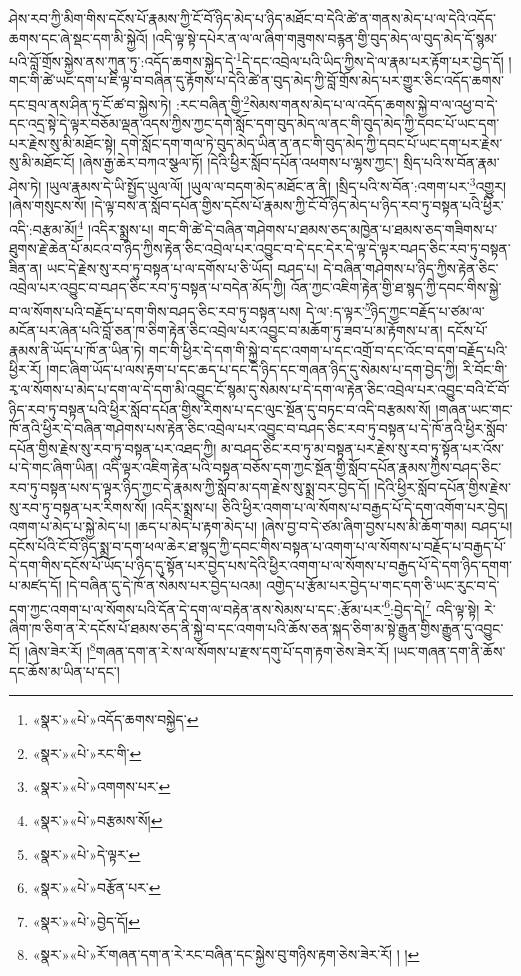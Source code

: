 ཤེས་རབ་ཀྱི་མིག་གིས་དངོས་པོ་རྣམས་ཀྱི་ངོ་བོ་ཉིད་མེད་པ་ཉིད་མཐོང་བ་དེའི་ཚེ་ན་གནས་མེད་པ་ལ་དེའི་འདོད་ཆགས་དང་ཞེ་སྡང་དག་མི་སྐྱེའོ། །འདི་ལྟ་སྟེ་དཔེར་ན་ལ་ལ་ཞིག་གཟུགས་བརྙན་གྱི་བུད་མེད་ལ་བུད་མེད་དོ་སྙམ་པའི་བློ་གྲོས་སྐྱེས་ནས་ཀུན་ཏུ་:འདོད་ཆགས་སྐྱེད་དེ་\footnote{«སྣར་»«པེ་»འདོད་ཆགས་བསྐྱེད་}དེ་དང་འབྲེལ་པའི་ཡིད་ཀྱིས་དེ་ལ་རྣམ་པར་རྟོག་པར་བྱེད་དོ། །གང་གི་ཚེ་ཡང་དག་པ་ཇི་ལྟ་བ་བཞིན་དུ་རྟོགས་པ་དེའི་ཚེ་ན་བུད་མེད་ཀྱི་བློ་གྲོས་མེད་པར་གྱུར་ཅིང་འདོད་ཆགས་དང་བྲལ་ནས་ཤིན་ཏུ་ངོ་ཚ་བ་སྐྱེས་ཏེ། :རང་བཞིན་གྱི་\footnote{«སྣར་»«པེ་»རང་གི་}སེམས་གནས་མེད་པ་ལ་འདོད་ཆགས་སྐྱེ་བ་ལ་འཕྱ་བ་དེ་དང་འདྲ་སྟེ་དེ་ལྟར་བཅོམ་ལྡན་འདས་ཀྱིས་ཀྱང་དགེ་སློང་དག་བུད་མེད་ལ་ནང་གི་བུད་མེད་ཀྱི་དབང་པོ་ཡང་དག་པར་རྗེས་སུ་མི་མཐོང་སྟེ། དགེ་སློང་དག་གལ་ཏེ་བུད་མེད་ཡིན་ན་ནང་གི་བུད་མེད་ཀྱི་དབང་པོ་ཡང་དག་པར་རྗེས་སུ་མི་མཐོང་ངོ། །ཞེས་རྒྱ་ཆེར་བཀའ་སྩལ་ཏོ། །དེའི་ཕྱིར་སློབ་དཔོན་འཕགས་པ་ལྷས་ཀྱང་། སྲིད་པའི་ས་བོན་རྣམ་ཤེས་ཏེ། །ཡུལ་རྣམས་དེ་ཡི་སྤྱོད་ཡུལ་ལོ། །ཡུལ་ལ་བདག་མེད་མཐོང་ན་ནི། །སྲིད་པའི་ས་བོན་:འགག་པར་\footnote{«སྣར་»«པེ་»འགགས་པར་}འགྱུར། །ཞེས་གསུངས་སོ། །དེ་ལྟ་བས་ན་སློབ་དཔོན་གྱིས་དངོས་པོ་རྣམས་ཀྱི་ངོ་བོ་ཉིད་མེད་པ་ཉིད་རབ་ཏུ་བསྟན་པའི་ཕྱིར་འདི་:བརྩམ་མོ།\footnote{«སྣར་»«པེ་»བརྩམས་སོ།} །འདིར་སྨྲས་པ། གང་གི་ཚེ་དེ་བཞིན་གཤེགས་པ་ཐམས་ཅད་མཁྱེན་པ་ཐམས་ཅད་གཟིགས་པ་ཐུགས་རྗེ་ཆེན་པོ་མངའ་བ་ཉིད་ཀྱིས་རྟེན་ཅིང་འབྲེལ་པར་འབྱུང་བ་དེ་དང་དེར་དེ་ལྟ་དེ་ལྟར་བཤད་ཅིང་རབ་ཏུ་བསྟན་ཟིན་ན། ཡང་དེ་རྗེས་སུ་རབ་ཏུ་བསྟན་པ་ལ་དགོས་པ་ཅི་ཡོད། བཤད་པ། དེ་བཞིན་གཤེགས་པ་ཉིད་ཀྱིས་རྟེན་ཅིང་འབྲེལ་པར་འབྱུང་བ་བཤད་ཅིང་རབ་ཏུ་བསྟན་པ་བདེན་མོད་ཀྱི། འོན་ཀྱང་འཇིག་རྟེན་གྱི་ཐ་སྙད་ཀྱི་དབང་གིས་སྐྱེ་བ་ལ་སོགས་པའི་བརྗོད་པ་དག་གིས་བཤད་ཅིང་རབ་ཏུ་བསྟན་པས། དེ་ལ་:ད་ལྟར་\footnote{«སྣར་»«པེ་»དེ་ལྟར་}ཉིད་ཀྱང་བརྗོད་པ་ཙམ་ལ་མངོན་པར་ཞེན་པའི་བློ་ཅན་ཁ་ཅིག་རྟེན་ཅིང་འབྲེལ་པར་འབྱུང་བ་མཆོག་ཏུ་ཟབ་པ་མ་རྟོགས་པ་ན། དངོས་པོ་རྣམས་ནི་ཡོད་པ་ཁོ་ན་ཡིན་ཏེ། གང་གི་ཕྱིར་དེ་དག་གི་སྐྱེ་བ་དང་འགག་པ་དང་འགྲོ་བ་དང་འོང་བ་དག་བརྗོད་པའི་ཕྱིར་རོ། །གང་ཞིག་ཡོད་པ་ལས་རྟག་པ་དང་ཆད་པ་དང་དེ་ཉིད་དང་གཞན་ཉིད་དུ་སེམས་པ་དག་བྱེད་ཀྱི། རི་བོང་གི་རྭ་ལ་སོགས་པ་མེད་པ་དག་ལ་དེ་དག་མི་འབྱུང་ངོ་སྙམ་དུ་སེམས་པ་དེ་དག་ལ་རྟེན་ཅིང་འབྲེལ་པར་འབྱུང་བའི་ངོ་བོ་ཉིད་རབ་ཏུ་བསྟན་པའི་ཕྱིར་སློབ་དཔོན་གྱིས་རིགས་པ་དང་ལུང་སྔོན་དུ་བཏང་བ་འདི་བརྩམས་སོ། །གཞན་ཡང་གང་ཁོ་ནའི་ཕྱིར་དེ་བཞིན་གཤེགས་པས་རྟེན་ཅིང་འབྲེལ་པར་འབྱུང་བ་བཤད་ཅིང་རབ་ཏུ་བསྟན་པ་དེ་ཁོ་ནའི་ཕྱིར་སློབ་དཔོན་གྱིས་རྗེས་སུ་རབ་ཏུ་བསྟན་པར་འཐད་ཀྱི། མ་བཤད་ཅིང་རབ་ཏུ་མ་བསྟན་པར་རྗེས་སུ་རབ་ཏུ་སྟོན་པར་འོས་པ་དེ་གང་ཞིག་ཡིན། འདི་ལྟར་འཇིག་རྟེན་པའི་བསྟན་བཅོས་དག་ཀྱང་སྔོན་གྱི་སློབ་དཔོན་རྣམས་ཀྱིས་བཤད་ཅིང་རབ་ཏུ་བསྟན་པས་ད་ལྟར་ཉིད་ཀྱང་དེ་རྣམས་ཀྱི་སློབ་མ་དག་རྗེས་སུ་སྨྲ་བར་བྱེད་དོ། །དེའི་ཕྱིར་སློབ་དཔོན་གྱིས་རྗེས་སུ་རབ་ཏུ་བསྟན་པར་རིགས་སོ། །འདིར་སྨྲས་པ། ཅིའི་ཕྱིར་འགག་པ་ལ་སོགས་པ་བརྒྱད་པོ་དེ་དག་འགོག་པར་བྱེད། འགག་པ་མེད་པ་སྐྱེ་མེད་པ། །ཆད་པ་མེད་པ་རྟག་མེད་པ། །ཞེས་བྱ་བ་དེ་ཙམ་ཞིག་བྱས་པས་མི་ཆོག་གམ། བཤད་པ། དངོས་པོའི་ངོ་བོ་ཉིད་སྨྲ་བ་དག་ཕལ་ཆེར་ཐ་སྙད་ཀྱི་དབང་གིས་བསྟན་པ་འགག་པ་ལ་སོགས་པ་བརྗོད་པ་བརྒྱད་པོ་དེ་དག་གིས་དངོས་པོ་ཡོད་པ་ཉིད་དུ་སྟོན་པར་བྱེད་པས་དེའི་ཕྱིར་འགག་པ་ལ་སོགས་པ་བརྒྱད་པོ་དེ་དག་ཉིད་དགག་པ་མཛད་དོ། །དེ་བཞིན་དུ་དེ་ཁོ་ན་སེམས་པར་བྱེད་པའམ། འགྱེད་པ་རྩོམ་པར་བྱེད་པ་གང་དག་ཅི་ཡང་རུང་བ་དེ་དག་ཀྱང་འགག་པ་ལ་སོགས་པའི་དོན་དེ་དག་ལ་བརྟེན་ནས་སེམས་པ་དང་:རྩོམ་པར་\footnote{«སྣར་»«པེ་»བརྩོན་པར་}:བྱེད་དེ།\footnote{«སྣར་»«པེ་»བྱེད་དོ།} འདི་ལྟ་སྟེ། རེ་ཞིག་ཁ་ཅིག་ན་རེ་དངོས་པོ་ཐམས་ཅད་ནི་སྐྱེ་བ་དང་འགག་པའི་ཆོས་ཅན་སྐད་ཅིག་མ་སྟེ་རྒྱུན་གྱིས་རྒྱུན་དུ་འབྱུང་ངོ། །ཞེས་ཟེར་རོ། །\footnote{«སྣར་»«པེ་»རོ་གཞན་དག་ན་རེ་རང་བཞིན་དང་སྐྱེས་བུ་གཉིས་རྟག་ཅེས་ཟེར་རོ། ། །}གཞན་དག་ན་རེ་ས་ལ་སོགས་པ་རྫས་དགུ་པོ་དག་རྟག་ཅེས་ཟེར་རོ། །ཡང་གཞན་དག་ནི་ཆོས་དང་ཆོས་མ་ཡིན་པ་དང་། 